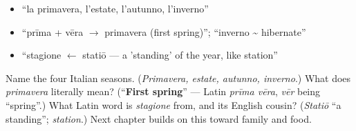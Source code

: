 \begin{itemize}
\raggedright
  \item \textquotedblleft{}la primavera, l'estate, l'autunno, l'inverno\textquotedblright{}
  \item \textquotedblleft{}prīma + vēra $\to$ primavera (first spring)\textquotedblright{}; \textquotedblleft{}inverno \textasciitilde{} hibernate\textquotedblright{}
  \item \textquotedblleft{}stagione $\leftarrow$ statiō — a 'standing' of the year, like station\textquotedblright{}
\end{itemize}

\begin{tcolorbox}[breakable,colback=teal!4,colframe=teal!35!black,title={Before you move on}]
Name the four Italian seasons. (\emph{Primavera, estate, autunno, inverno}.) What does \emph{primavera} literally mean? (\textquotedblleft{}\textbf{First spring}\textquotedblright{} — Latin \emph{prīma vēra}, \emph{vēr} being \textquotedblleft{}spring\textquotedblright{}.) What Latin word is \emph{stagione} from, and its English cousin? (\emph{Statiō} \textquotedblleft{}a standing\textquotedblright{}; \emph{station}.) Next chapter builds on this toward family and food.
\end{tcolorbox}
